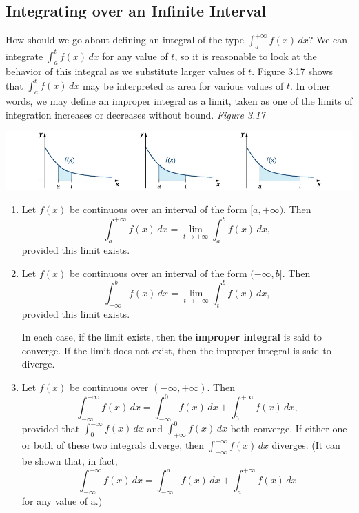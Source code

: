 \documentclass{report}
\begin{document}
        \subsection*{Integrating over an Infinite Interval}
        \bigbreak \noindent 
        How should we go about defining an integral of the type $\int_{a}^{+\infty} f(x) \, dx$? We can integrate $\int_{a}^{t} f(x) \, dx$ for any value of $t$, so it is reasonable to look at the behavior of this integral as we substitute larger values of $t$. Figure 3.17 shows that $\int_{a}^{t} f(x) \, dx$ may be interpreted as area for various values of $t$. In other words, we may define an improper integral as a limit, taken as one of the limits of integration increases or decreases without bound.
        \bigbreak \noindent 
        \textit{Figure 3.17}
        \bigbreak \noindent 
        \begin{center}
            \includegraphics[scale=0.5]{./figures/mane2.png}
        \end{center}
        \bigbreak \noindent 
        \begin{definition}
            \begin{enumerate}
                \item Let \( f(x) \) be continuous over an interval of the form \([a,+\infty)\). Then
            \[
            \int_{a}^{+\infty} f(x) \, dx = \lim_{{t \to +\infty}} \int_{a}^{t} f(x) \, dx,
            \] 
            provided this limit exists.
            \item  Let \( f(x) \) be continuous over an interval of the form \((- \infty, b]\). Then
            \begin{equation}
            \int_{-\infty}^{b} f(x) \, dx = \lim_{{t \to -\infty}} \int_{t}^{b} f(x) \, dx,
            \end{equation}
            provided this limit exists.

            In each case, if the limit exists, then the \textbf{improper integral} is said to converge. If the limit does not exist, then the improper integral is said to diverge.
            \item Let \( f(x) \) be continuous over \((- \infty, +\infty)\). Then
            \begin{equation}
            \int_{-\infty}^{+\infty} f(x) \, dx = \int_{-\infty}^{0} f(x) \, dx + \int_{0}^{+\infty} f(x) \, dx,
            \end{equation}
            provided that \(\int_{0}^{-\infty} f(x) \, dx\) and \(\int_{+\infty}^{0} f(x) \, dx\) both converge. If either one or both of these two integrals diverge, then \(\int_{-\infty}^{+\infty} f(x) \, dx\) diverges. (It can be shown that, in fact, 
            \[
            \int_{-\infty}^{+\infty} f(x) \, dx = \int_{-\infty}^{a} f(x) \, dx + \int_{a}^{+\infty} f(x) \, dx
            \]
            for any value of a.)
            \end{enumerate}
        \end{definition}
\end{document}

